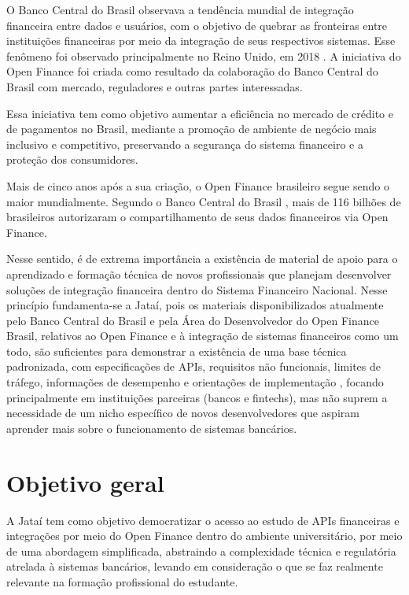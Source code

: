 \documentclass[
  12pt,
  openright,
  oneside,
  a4paper,
  brazilian
]{abntex2}
\newcommand{\bcb}{Banco Central do Brasil}
\newcommand{\sfn}{Sistema Financeiro Nacional}
\begin{document}
O \bcb{} observava a tendência mundial de integração financeira entre dados e usuários, com o objetivo de quebrar as fronteiras entre instituições financeiras por meio da integração de seus respectivos sistemas. Esse fenômeno foi observado principalmente no Reino Unido, em 2018 \parencite{openfinancebrasil2021mundo}. A iniciativa do Open Finance foi criada como resultado da colaboração do \bcb{} com mercado, reguladores e outras partes interessadas.

\begin{citacao}
Essa iniciativa tem como objetivo aumentar a eficiência no mercado de crédito e de pagamentos no Brasil, mediante a promoção de ambiente de negócio mais inclusivo e competitivo, preservando a segurança do sistema financeiro e a proteção dos consumidores.

\parencite{bcb2019comunicado33455}
\end{citacao}

Mais de cinco anos após a sua criação, o Open Finance brasileiro segue sendo o maior mundialmente. Segundo o \bcb{} \citeyear{bcbOpenFinanceEntender}, mais de 116 bilhões de brasileiros autorizaram o compartilhamento de seus dados financeiros via Open Finance.

Nesse sentido, é de extrema importância a existência de material de apoio para o aprendizado e formação técnica de novos profissionais que planejam desenvolver soluções de integração financeira dentro do \sfn{}. Nesse princípio fundamenta-se a Jataí, pois os materiais disponibilizados atualmente pelo \bcb{} e pela Área do Desenvolvedor do Open Finance Brasil, relativos ao Open Finance e à integração de sistemas financeiros como um todo, são suficientes para demonstrar a existência de uma base técnica padronizada, com especificações de APIs, requisitos não funcionais, limites de tráfego, informações de desempenho e orientações de implementação \parencite{openfinancebrasilAreaDesenvolvedor}, focando principalmente em instituições parceiras (bancos e fintechs), mas não suprem a necessidade de um nicho específico de novos desenvolvedores que aspiram aprender mais sobre o funcionamento de sistemas bancários.

\section{Objetivo geral}


A Jataí tem como objetivo democratizar o acesso ao estudo de APIs financeiras e integrações por meio do Open Finance dentro do ambiente universitário, por meio de uma abordagem simplificada, abstraindo a complexidade técnica e regulatória atrelada à sistemas bancários, levando em consideração o que se faz realmente relevante na formação profissional do estudante. 
\end{document}
